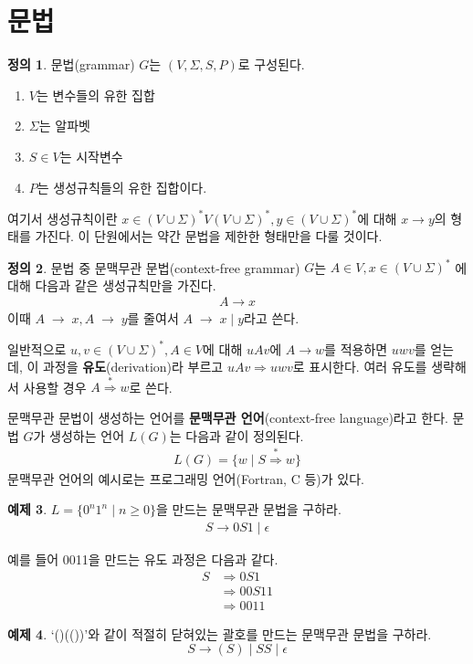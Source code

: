\documentclass[b5paper, 10pt]{book}
\theoremstyle{definition}
\newtheorem{defn}{정의}[chapter]
\newtheorem{ex}[defn]{예제}
\begin{document}
\section{문법}
\begin{defn}
    문법(grammar) $G$는 $(V, \Sigma, S, P)$로 구성된다.
\end{defn} 
\begin{enumerate}
    \item $V$는 변수들의 유한 집합
    \item $\Sigma$는 알파벳
    \item $S \in V$는 시작변수
    \item $P$는 생성규칙들의 유한 집합이다. 
\end{enumerate}
여기서 생성규칙이란 $x\in (V \cup \Sigma)^* V 
(V \cup \Sigma )^*, y \in (V \cup \Sigma)^*$에 대해 $x \rightarrow y$의 형태를 가진다.
이 단원에서는 약간 문법을 제한한 형태만을 다룰 것이다. 
\begin{defn}
    문법 중 문맥무관 문법(context-free grammar) $G$는 $A \in V, x \in (V \cup \Sigma)^*$ 에 대해
다음과 같은 생성규칙만을 가진다.
\begin{align*}
    A \rightarrow x
\end{align*}
이때 $A \; \rightarrow \; x, A\; \rightarrow \; y$를 줄여서 $A \; \rightarrow \; x \; \vert \; y $라고 쓴다.
\end{defn} 
일반적으로 $u, v \in (V \cup \Sigma)^*, A \in V$에 대해 $uAv$에 $A \rightarrow w$를
적용하면 $uwv$를 얻는데, 이 과정을 \textbf{유도}(derivation)라 부르고 $uAv \Rightarrow uwv$로 표시한다. 
여러 유도를 생략해서 사용할 경우 $A \overset{*}{\Rightarrow} w$로 쓴다. 

문맥무관 문법이 생성하는 언어를 \textbf{문맥무관 언어}(context-free language)라고 한다. 
문법 $G$가 생성하는 언어 $L(G)$는 다음과 같이 정의된다.
\begin{align*}
    L(G) = \{ w \; \vert \; S \overset{*}{\Rightarrow} w \}
\end{align*}
문맥무관 언어의 예시로는 프로그래밍 언어(Fortran, C 등)가 있다. 
\begin{ex} \label{0n1n_CFG}
$L = \{ 0^n 1^n \; \vert \; n \ge 0\}$을 만드는 문맥무관 문법을 구하라.
\begin{align*}
    S \rightarrow 0S1 \; \vert \; \epsilon 
\end{align*}
\end{ex}
예를 들어 0011을 만드는 유도 과정은 다음과 같다.
\begin{align*}
    S &\Rightarrow 0S1 \\
    &\Rightarrow 00S11 \\ 
    &\Rightarrow 0011
\end{align*}
\begin{ex} \label{bracket_CFG}
     `()(())'와 같이 적절히 닫혀있는 괄호를 만드는 문맥무관 문법을 구하라.
    $$ S \rightarrow (S) \; \vert \; SS \; \vert \; \epsilon $$
\end{ex} 
\end{document}
